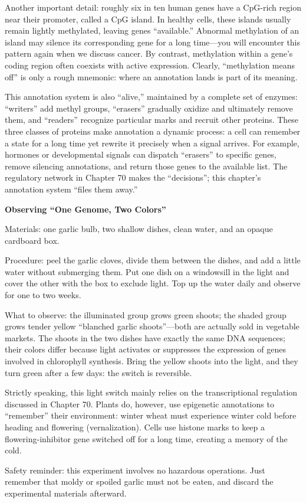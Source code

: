 Another important detail: roughly six in ten human genes have a CpG-rich region near their promoter, called a CpG island. In healthy cells, these islands usually remain lightly methylated, leaving genes ``available.'' Abnormal methylation of an island may silence its corresponding gene for a long time---you will encounter this pattern again when we discuss cancer. By contrast, methylation within a gene's coding region often coexists with active expression. Clearly, ``methylation means off'' is only a rough mnemonic: where an annotation lands is part of its meaning.

This annotation system is also ``alive,'' maintained by a complete set of enzymes: ``writers'' add methyl groups, ``erasers'' gradually oxidize and ultimately remove them, and ``readers'' recognize particular marks and recruit other proteins. These three classes of proteins make annotation a dynamic process: a cell can remember a state for a long time yet rewrite it precisely when a signal arrives. For example, hormones or developmental signals can dispatch ``erasers'' to specific genes, remove silencing annotations, and return those genes to the available list. The regulatory network in Chapter 70 makes the ``decisions''; this chapter's annotation system ``files them away.''

\begin{shiyan}
\textbf{Observing ``One Genome, Two Colors''}

Materials: one garlic bulb, two shallow dishes, clean water, and an opaque cardboard box.

Procedure: peel the garlic cloves, divide them between the dishes, and add a little water without submerging them. Put one dish on a windowsill in the light and cover the other with the box to exclude light. Top up the water daily and observe for one to two weeks.

What to observe: the illuminated group grows green shoots; the shaded group grows tender yellow ``blanched garlic shoots''---both are actually sold in vegetable markets. The shoots in the two dishes have exactly the same DNA sequences; their colors differ because light activates or suppresses the expression of genes involved in chlorophyll synthesis. Bring the yellow shoots into the light, and they turn green after a few days: the switch is reversible.

Strictly speaking, this light switch mainly relies on the transcriptional regulation discussed in Chapter 70. Plants do, however, use epigenetic annotations to ``remember'' their environment: winter wheat must experience winter cold before heading and flowering (vernalization). Cells use histone marks to keep a flowering-inhibitor gene switched off for a long time, creating a memory of the cold.

Safety reminder: this experiment involves no hazardous operations. Just remember that moldy or spoiled garlic must not be eaten, and discard the experimental materials afterward.
\end{shiyan}

